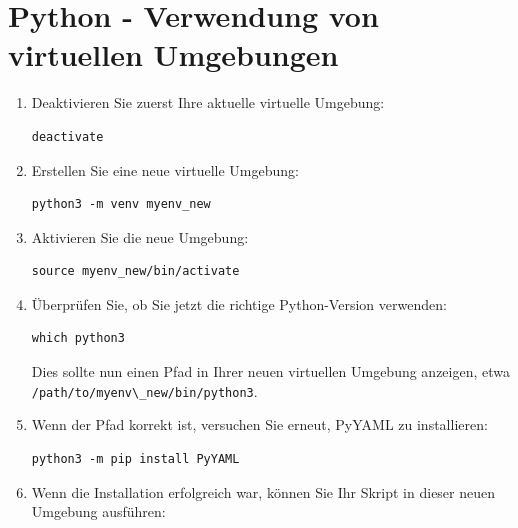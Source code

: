 \documentclass{vorlage-design-main}
\title{}
\author{Jan Unger}
\date{\today}
\begin{document}
\maketitle

\begin{abstract}



\end{abstract}

\section{Python - Verwendung von virtuellen
Umgebungen}\label{python---verwendung-von-virtuellen-umgebungen}

\begin{enumerate}
\def\labelenumi{\arabic{enumi}.}
\item
  Deaktivieren Sie zuerst Ihre aktuelle virtuelle Umgebung:

\begin{lstlisting}
deactivate
\end{lstlisting}
\item
  Erstellen Sie eine neue virtuelle Umgebung:

\begin{lstlisting}
python3 -m venv myenv_new
\end{lstlisting}
\item
  Aktivieren Sie die neue Umgebung:

\begin{lstlisting}
source myenv_new/bin/activate
\end{lstlisting}
\item
  Überprüfen Sie, ob Sie jetzt die richtige Python-Version verwenden:

\begin{lstlisting}
which python3
\end{lstlisting}

  Dies sollte nun einen Pfad in Ihrer neuen virtuellen Umgebung
  anzeigen, etwa
  \verb|/path/to/myenv\_new/bin/python3|.
\item
  Wenn der Pfad korrekt ist, versuchen Sie erneut, PyYAML zu
  installieren:

\begin{lstlisting}
python3 -m pip install PyYAML
\end{lstlisting}
\item
  Wenn die Installation erfolgreich war, können Sie Ihr Skript in dieser
  neuen Umgebung ausführen:


\end{enumerate}
\end{document}
